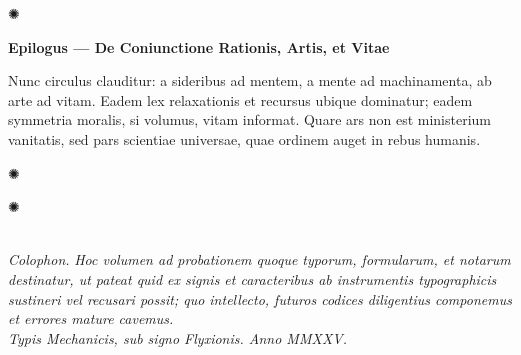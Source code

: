 \documentclass[12pt]{article}
\newcommand{\orn}{\centerline{\large ✺}}
\newcommand{\divider}{\vspace{1em}\orn\vspace{1em}}
\begin{document}
\divider

\begin{center}\textbf{Epilogus — De Coniunctione Rationis, Artis, et Vitae}\end{center}

Nunc circulus clauditur: a sideribus ad mentem, a mente ad machinamenta, ab arte ad vitam. Eadem lex relaxationis et recursus ubique dominatur; eadem symmetria moralis, si volumus, vitam informat. Quare ars non est ministerium vanitatis, sed pars scientiae universae, quae ordinem auget in rebus humanis.

\divider

\begin{center}
\orn\\[0.5em]
\textit{Colophon.} \;
\textit{Hoc volumen \emph{ad probationem} quoque typorum, formularum, et notarum destinatur, ut pateat quid ex signis et caracteribus ab instrumentis typographicis sustineri vel recusari possit; quo intellecto, futuros codices diligentius componemus et errores mature cavemus.}\\[0.25em]
\textit{Typis Mechanicis, sub signo Flyxionis. \; Anno MMXXV.}
\end{center}
\end{document}

